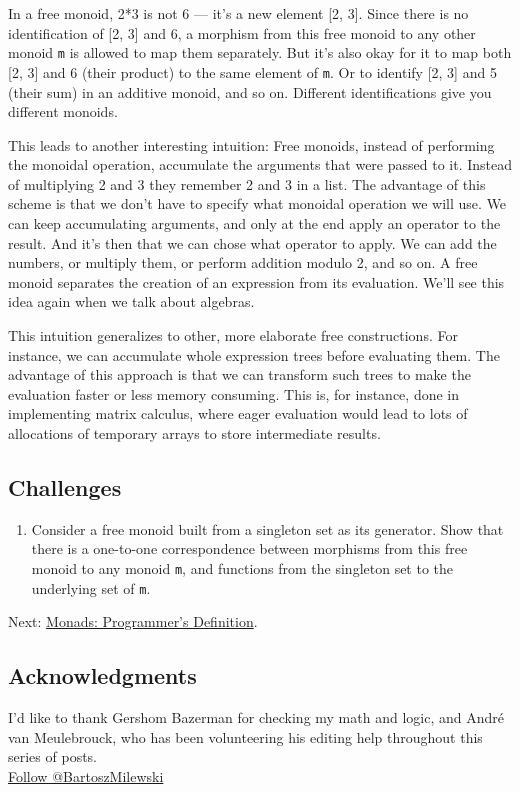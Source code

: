 In a free monoid, 2*3 is not 6 --- it's a new element {[}2, 3{]}. Since
there is no identification of {[}2, 3{]} and 6, a morphism from this
free monoid to any other monoid \texttt{m} is allowed to map them
separately. But it's also okay for it to map both {[}2, 3{]} and 6
(their product) to the same element of \texttt{m}. Or to identify {[}2,
3{]} and 5 (their sum) in an additive monoid, and so on. Different
identifications give you different monoids.

This leads to another interesting intuition: Free monoids, instead of
performing the monoidal operation, accumulate the arguments that were
passed to it. Instead of multiplying 2 and 3 they remember 2 and 3 in a
list. The advantage of this scheme is that we don't have to specify what
monoidal operation we will use. We can keep accumulating arguments, and
only at the end apply an operator to the result. And it's then that we
can chose what operator to apply. We can add the numbers, or multiply
them, or perform addition modulo 2, and so on. A free monoid separates
the creation of an expression from its evaluation. We'll see this idea
again when we talk about algebras.

This intuition generalizes to other, more elaborate free constructions.
For instance, we can accumulate whole expression trees before evaluating
them. The advantage of this approach is that we can transform such trees
to make the evaluation faster or less memory consuming. This is, for
instance, done in implementing matrix calculus, where eager evaluation
would lead to lots of allocations of temporary arrays to store
intermediate results.

\subsection{Challenges}\label{challenges}

\begin{enumerate}
\tightlist
\item
  Consider a free monoid built from a singleton set as its generator.
  Show that there is a one-to-one correspondence between morphisms from
  this free monoid to any monoid \texttt{m}, and functions from the
  singleton set to the underlying set of \texttt{m}.
\end{enumerate}

Next:
\href{https://bartoszmilewski.com/2016/11/21/monads-programmers-definition/}{Monads:
Programmer's Definition}.

\subsection{Acknowledgments}\label{acknowledgments}

I'd like to thank Gershom Bazerman for checking my math and logic, and
André van Meulebrouck, who has been volunteering his editing help
throughout this series of posts.\\
\href{https://twitter.com/BartoszMilewski}{Follow @BartoszMilewski}

